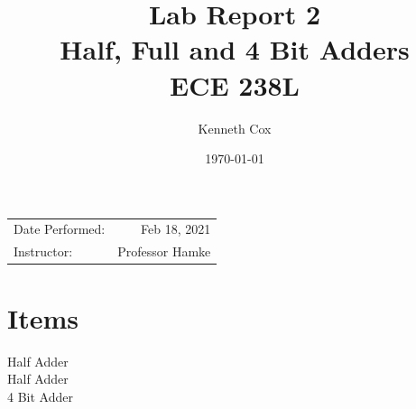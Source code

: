 \documentclass{article}
\title{Lab Report 2 \\ Half, Full and 4 Bit Adders \\ECE 238L \\} %
\author{Kenneth Cox}
\date{\today} %
\begin{document}
\maketitle %

\begin{center}
\begin{tabular}{l r}
Date Performed: &Feb 18, 2021 \\ %
Instructor: & Professor Hamke %
\end{tabular}
\end{center}





\section{Items}

\begin{description}
\item[Half Adder]
\item[Half Adder]
\item[4 Bit Adder]
\end{description} 
 
\end{document}
